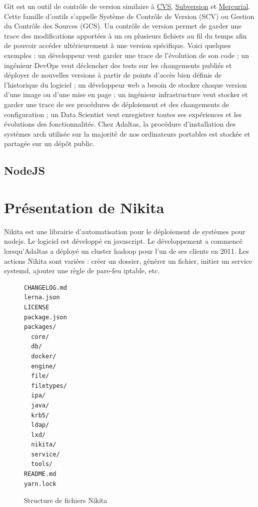 \documentclass[12pt, french]{report}
\begin{document}
Git est un outil de contrôle de version similaire à \href{https://en.wikipedia.org/wiki/Concurrent_Versions_System}{CVS}, \href{https://subversion.apache.org/}{Subversion} et \href{https://www.mercurial-scm.org/}{Mercurial}. Cette famille d'outils s'appelle Système de Contrôle de Version (SCV) ou Gestion du Contrôle des Sources (GCS). Un contrôle de version permet de garder une trace des modifications apportées à un ou plusieurs fichiers au fil du temps afin de pouvoir accéder ultérieurement à une version spécifique. Voici quelques exemples : un développeur veut garder une trace de l'évolution de son code ; un ingénieur DevOps veut déclencher des tests sur les changements publiés et déployer de nouvelles versions à partir de points d'accès bien définis de l'historique du logiciel ; un développeur web a besoin de stocker chaque version d'une image ou d'une mise en page ; un ingénieur infrastructure veut stocker et garder une trace de ses procédures de déploiement et des changements de configuration ; un Data Scientist veut enregistrer toutes ses expériences et les évolutions des fonctionnalités. Chez Adaltas, la procédure d'installation des systèmes \gls{arch} utilisée sur la majorité de nos ordinateurs portables est stockée et partagée sur un dépôt public.

\subsection{NodeJS}

\section{Présentation de Nikita}

Nikita est une librairie d’automatisation pour le déploiement de systèmes pour \gls{nodejs}. Le logiciel est développé en \gls{javascript}. Le développement a commencé lorsqu'Adaltas a déployé un cluster \gls{hadoop} pour l’un de ses clients en 2011. Les actions Nikita sont variées : créer un dossier, générer un fichier, initier un service systemd, ajouter une règle de pare-feu iptable, etc.

\begin{figure}[h]
\begin{verbatim}
CHANGELOG.md
lerna.json
LICENSE
package.json
packages/
  core/
  db/
  docker/
  engine/
  file/
  filetypes/
  ipa/
  java/
  krb5/
  ldap/
  lxd/
  nikita/
  service/
  tools/
README.md
yarn.lock
\end{verbatim}
\centering
\caption{Structure de fichiers Nikita}
\label{fig:nikitaFileStructure}
\end{figure}
\end{document}
